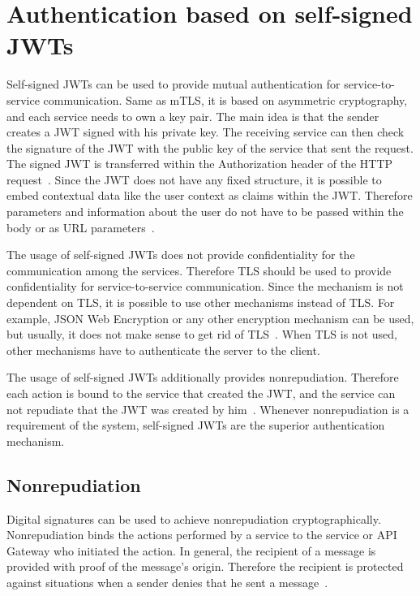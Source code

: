 \section{Authentication based on self-signed JWTs}
Self-signed JWTs can be used to provide mutual authentication for service-to-service communication.
Same as mTLS, it is based on asymmetric cryptography, and each service needs to own a key pair.
The main idea is that the sender creates a JWT signed with his private key.
The receiving service can then check the signature of the JWT with the public key of the service that sent the request.
The signed JWT is transferred within the Authorization header of the HTTP request~\cite{dias2020microservices}.
Since the JWT does not have any fixed structure, it is possible to embed contextual data like the user context as claims within the JWT.
Therefore parameters and information about the user do not have to be passed within the body or as URL parameters~\cite{dias2020microservices}.


The usage of self-signed JWTs does not provide confidentiality for the communication among the services.
Therefore TLS should be used to provide confidentiality for service-to-service communication.
Since the mechanism is not dependent on TLS, it is possible to use other mechanisms instead of TLS.
For example, JSON Web Encryption or any other encryption mechanism can be used, but usually, it does not make sense to get rid of TLS~\cite{dias2020microservices}.
When TLS is not used, other mechanisms have to authenticate the server to the client.

The usage of self-signed JWTs additionally provides nonrepudiation.
Therefore each action is bound to the service that created the JWT, and the service can not repudiate that the JWT was created by him~\cite{dias2020microservices}.
Whenever nonrepudiation is a requirement of the system, self-signed JWTs are the superior authentication mechanism.

\subsection{Nonrepudiation}
Digital signatures can be used to achieve nonrepudiation cryptographically.
Nonrepudiation binds the actions performed by a service to the service or API Gateway who initiated the action.
In general, the recipient of a message is provided with proof of the message's origin.
Therefore the recipient is protected against situations when a sender denies that he sent a message~\cite{wu20131200}.

